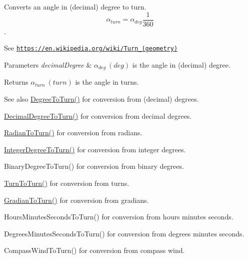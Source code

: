 Converts an angle in (decimal) degree to turn. \[\alpha_{turn}=\alpha_{deg}\frac{1}{360}\]. 

See \href{https://en.wikipedia.org/wiki/Turn_(geometry)}{\tt https\+://en.\+wikipedia.\+org/wiki/\+Turn\+\_\+(geometry)} 
\begin{DoxyParams}{Parameters}
{\em decimal\+Degree} & $\alpha_{deg}\ (deg)$ is the angle in (decimal) degree. \\
\hline
\end{DoxyParams}
\begin{DoxyReturn}{Returns}
$\alpha_{turn}\ (turn)$ is the angle in turns. 
\end{DoxyReturn}
\begin{DoxySeeAlso}{See also}
\mbox{\hyperlink{group___e_g_x_math-_angle_conversions-_degree_gafb4ce930493a7d6202ede3ee1630ef5d}{Degree\+To\+Turn()}} for conversion from (decimal) degrees. 

\mbox{\hyperlink{group___e_g_x_math-_angle_conversions-_decimal_degree_ga396a13c10acdef5026c12f3217b142c1}{Decimal\+Degree\+To\+Turn()}} for conversion from decimal degrees. 

\mbox{\hyperlink{group___e_g_x_math-_angle_conversions-_radian_ga8492d6d2f6467c619b65e5fb75a9ae04}{Radian\+To\+Turn()}} for conversion from radians. 

\mbox{\hyperlink{group___e_g_x_math-_angle_conversions-_integer_degree_ga06ddbdada5a3978105c855d4aae735ae}{Integer\+Degree\+To\+Turn()}} for conversion from integer degrees. 

Binary\+Degree\+To\+Turn() for conversion from binary degrees. 

\mbox{\hyperlink{group___e_g_x_math-_angle_conversions-_turn_ga32c8dfa2861fefd0b18e36f8d6d95ed4}{Turn\+To\+Turn()}} for conversion from turns. 

\mbox{\hyperlink{group___e_g_x_math-_angle_conversions-_gradian_ga11b42138910d26474f47c0a2043911c9}{Gradian\+To\+Turn()}} for conversion from gradians. 

Hours\+Minutes\+Seconds\+To\+Turn() for conversion from hours minutes seconds. 

Degrees\+Minutes\+Seconds\+To\+Turn() for conversion from degrees minutes seconds. 

Compass\+Wind\+To\+Turn() for conversion from compass wind. 
\end{DoxySeeAlso}
